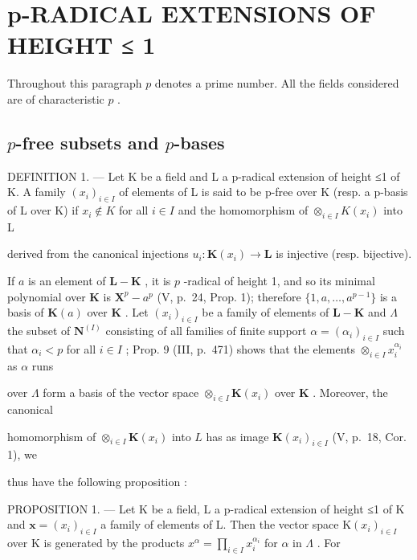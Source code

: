 \section{p-RADICAL EXTENSIONS OF HEIGHT ≤ 1}

Throughout this paragraph \(p\) denotes a prime number. All the fields considered are of characteristic \(p\) .

\subsection{\texorpdfstring{\(p\)-free subsets and \(p\)-bases}{p-free subsets and p-bases}}

DEFINITION 1. --- Let K be a field and L a p-radical extension of height ≤1 of K. A family \((x_i)_{i \in I}\) of elements of L is said to be p-free over K (resp. a p-basis of L over K) if \(x_i \notin K\) for all \(i \in I\) and the homomorphism of \(\otimes_{i \in I} K(x_i)\) into L

derived from the canonical injections \(u_{i}:\mathbf{K}(x_{i})\to \mathbf{L}\) is injective (resp. bijective).

If \(a\) is an element of \(\mathbf{L} - \mathbf{K}\) , it is \(p\) -radical of height 1, and so its minimal polynomial over \(\mathbf{K}\) is \(\mathbf{X}^p - a^p\) (V, p.~24, Prop. 1); therefore \(\{1, a, \ldots, a^{p-1}\}\) is a basis of \(\mathbf{K}(a)\) over \(\mathbf{K}\) . Let \((x_i)_{i \in I}\) be a family of elements of \(\mathbf{L} - \mathbf{K}\) and \(\Lambda\) the subset of \(\mathbf{N}^{(I)}\) consisting of all families of finite support \(\alpha = (\alpha_i)_{i \in I}\) such that \(\alpha_i < p\) for all \(i \in I\) ; Prop. 9 (III, p.~471) shows that the elements \(\otimes_{i \in I} x_i^{\alpha_i}\) as \(\alpha\) runs

over \(\Lambda\) form a basis of the vector space \(\otimes_{i\in I}\mathbf{K}(x_i)\) over \(\mathbf{K}\) . Moreover, the canonical

homomorphism of \(\otimes_{i\in I}\mathbf{K}(x_i)\) into \(L\) has as image \(\mathbf{K}(x_i)_{i\in I}\) (V, p.~18, Cor. 1), we

thus have the following proposition :

PROPOSITION 1. --- Let K be a field, L a p-radical extension of height ≤1 of K and \(\mathbf{x} = (x_{i})_{i \in I}\) a family of elements of L. Then the vector space \(\mathrm{K}(x_{i})_{i \in I}\) over K is generated by the products \(x^{\alpha} = \prod_{i \in I} x_{i}^{\alpha_{i}}\) for \(\alpha\) in \(\Lambda\) . For

